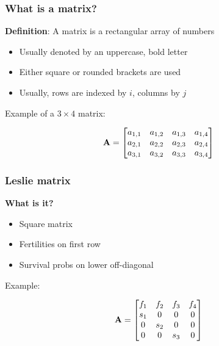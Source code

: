 \documentclass[color=usenames,dvipsnames]{beamer}\usepackage[]{graphicx}\usepackage[]{xcolor}
\begin{document}
\begin{frame}
  \frametitle{What is a matrix?}
  {\bf Definition}: A matrix is a rectangular array of numbers
  \begin{itemize}
    \item Usually denoted by an uppercase, bold letter
    \item Either square or rounded brackets are used
    \item Usually, rows are indexed by $i$, columns by $j$
  \end{itemize}
  \pause

  \vspace{1cm}
  Example of a $3 \times 4$ matrix: \par
  \begin{center}
    \Large
    \[
    { \bf A} =
    \begin{bmatrix}
      a_{1,1} & a_{1,2} & a_{1,3} & a_{1,4} \\
      a_{2,1} & a_{2,2} & a_{2,3} & a_{2,4} \\
      a_{3,1} & a_{3,2} & a_{3,3} & a_{3,4}
    \end{bmatrix}
    \]
  \end{center}
\end{frame}


\begin{frame}
  \frametitle{Leslie matrix}
  \large
  {\bf What is it?}
  \begin{itemize}
    \item Square matrix %
    \item Fertilities on first row
    \item Survival probs on lower off-diagonal
  \end{itemize}
  \pause
  \vspace{.8cm}
  Example:
  \large
  \begin{center}
    \[
    {\bf A} =
    \begin{bmatrix}
      f_1 & f_2 & f_3 & f_4 \\
      s_1 & 0 & 0 & 0 \\
      0 & s_2 & 0 & 0 \\
      0 & 0 & s_3 & 0
    \end{bmatrix}
    \]
  \end{center}
\end{frame}






\end{document}
